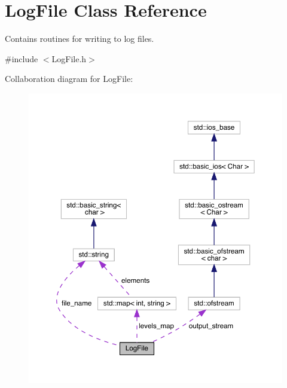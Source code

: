 \hypertarget{class_log_file}{}\section{Log\+File Class Reference}
\label{class_log_file}


Contains routines for writing to log files.  




{\ttfamily \#include $<$Log\+File.\+h$>$}



Collaboration diagram for Log\+File\+:
\nopagebreak
\begin{figure}[H]
\begin{center}
\leavevmode
\includegraphics[width=350pt]{class_log_file__coll__graph}
\end{center}
\end{figure}
